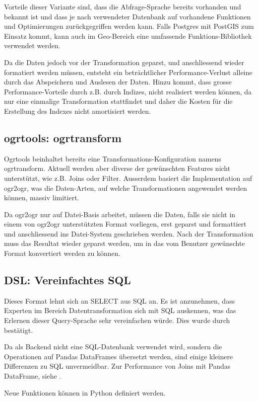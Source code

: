Vorteile dieser Variante sind, dass die Abfrage-Sprache bereits vorhanden und bekannt ist und dass je nach verwendeter Datenbank auf vorhandene Funktionen und Optimierungen zurückgegriffen werden kann. Falls Postgres mit PostGIS zum Einsatz kommt, kann auch im Geo-Bereich eine umfassende Funktions-Bibliothek verwendet werden. 

Da die Daten jedoch vor der Transformation geparst, und anschliessend wieder formatiert werden müssen, entsteht ein beträchtlicher Performance-Verlust alleine durch das Abspeichern und Auslesen der Daten. Hinzu kommt, dass grosse Performance-Vorteile durch z.B. durch Indizes, nicht realisiert werden können, da nur eine einmalige Transformation stattfindet und daher die Kosten für die Erstellung des Indexes nicht amortisiert werden.

\subsection{ogrtools: ogrtransform}
Ogrtools beinhaltet bereits eine Transformations-Konfiguration namens ogrtransform. Aktuell werden aber diverse der gewünschten Features nicht unterstützt, wie z.B. Joins oder Filter. Ausserdem basiert die Implementation auf ogr2ogr, was die Daten-Arten, auf welche Transformationen angewendet werden können, massiv limitiert.

Da ogr2ogr nur auf Datei-Basis arbeitet, müssen die Daten, falls sie nicht in einem von ogr2ogr unterstützten Format vorliegen, erst geparst und formattiert und anschliessend ins Datei-System geschrieben werden. Nach der Transformation muss das Resultat wieder geparst werden, um in das vom Benutzer gewünschte Format konvertiert werden zu können. 

\subsection{DSL: Vereinfachtes SQL}
Dieses Format lehnt sich an SELECT aus SQL an. Es ist anzunehmen, dass Experten im Bereich Datentransformation sich mit SQL auskennen, was das Erlernen dieser Query-Sprache sehr vereinfachen würde. Dies wurde durch \prof bestätigt. 

Da als Backend nicht eine SQL-Datenbank verwendet wird, sondern die Operationen auf Pandas DataFrames übersetzt werden, sind einige kleinere Differenzen zu SQL unvermeidbar. Zur Performance von Joins mit Pandas DataFrame, siehe \cite{pandasMergePerformance}.

Neue Funktionen können in Python definiert werden.


